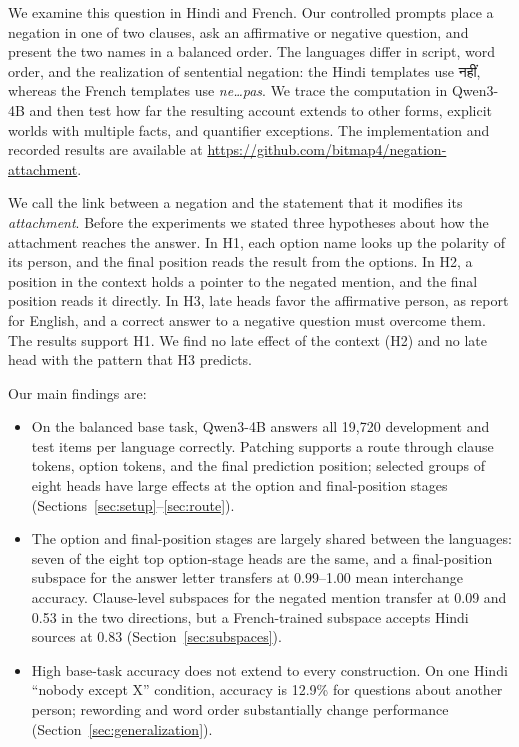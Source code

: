 \documentclass[11pt]{article}
\newcommand{\hi}[1]{{\hindifont #1}}
\begin{document}
We examine this question in Hindi and French. Our controlled prompts place a negation in one of two clauses, ask an affirmative or negative question, and present the two names in a balanced order. The languages differ in script, word order, and the realization of sentential negation: the Hindi templates use \hi{नहीं}, whereas the French templates use \emph{ne\ldots pas}. We trace the computation in Qwen3-4B and then test how far the resulting account extends to other forms, explicit worlds with multiple facts, and quantifier exceptions. The implementation and recorded results are available at \url{https://github.com/bitmap4/negation-attachment}.

We call the link between a negation and the statement that it modifies its \emph{attachment}. Before the experiments we stated three hypotheses about how the attachment reaches the answer. In H1, each option name looks up the polarity of its person, and the final position reads the result from the options. In H2, a position in the context holds a pointer to the negated mention, and the final position reads it directly. In H3, late heads favor the affirmative person, as \citet{zhou2026negation} report for English, and a correct answer to a negative question must overcome them. The results support H1. We find no late effect of the context (H2) and no late head with the pattern that H3 predicts.

Our main findings are:
\begin{itemize}
\item On the balanced base task, Qwen3-4B answers all 19,720 development and test items per language correctly. Patching supports a route through clause tokens, option tokens, and the final prediction position; selected groups of eight heads have large effects at the option and final-position stages (Sections~\ref{sec:setup}--\ref{sec:route}).
\item The option and final-position stages are largely shared between the languages: seven of the eight top option-stage heads are the same, and a final-position subspace for the answer letter transfers at 0.99--1.00 mean interchange accuracy. Clause-level subspaces for the negated mention transfer at 0.09 and 0.53 in the two directions, but a French-trained subspace accepts Hindi sources at 0.83 (Section~\ref{sec:subspaces}).
\item High base-task accuracy does not extend to every construction. On one Hindi ``nobody except X'' condition, accuracy is 12.9\% for questions about another person; rewording and word order substantially change performance (Section~\ref{sec:generalization}).
\end{itemize}
\end{document}
